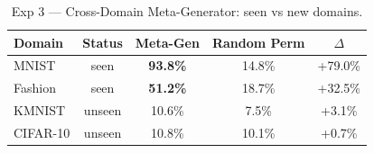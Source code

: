 \begin{table}[h!]
\centering
\caption{Exp 3 --- Cross-Domain Meta-Generator: seen vs new domains.}
\begin{tabular}{l c c c c}
\hline
\textbf{Domain} & \textbf{Status} & \textbf{Meta-Gen} & \textbf{Random Perm} & \textbf{$\Delta$} \\
\hline
MNIST & seen & \textbf{93.8\%} & 14.8\% & +79.0\% \\
Fashion & seen & \textbf{51.2\%} & 18.7\% & +32.5\% \\
KMNIST & unseen & 10.6\% & 7.5\% & +3.1\% \\
CIFAR-10 & unseen & 10.8\% & 10.1\% & +0.7\% \\
\hline
\end{tabular}
\label{tab:cpu_exp3}
\end{table}
